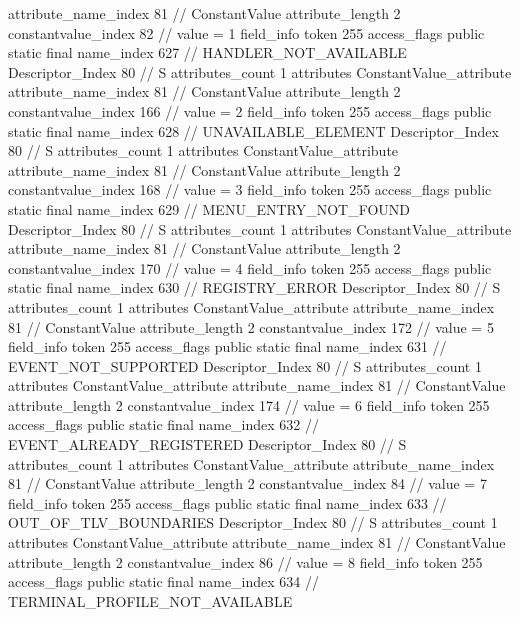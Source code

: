 {{{{{{{					attribute_name_index	81		// ConstantValue
					attribute_length	2
					constantvalue_index	82		// value = 1
				}
				}
			}
			field_info {
				token	255
				access_flags	public static final
				name_index	627		// HANDLER_NOT_AVAILABLE
				Descriptor_Index	80		// S
				attributes_count	1
				attributes {
				ConstantValue_attribute {
					attribute_name_index	81		// ConstantValue
					attribute_length	2
					constantvalue_index	166		// value = 2
				}
				}
			}
			field_info {
				token	255
				access_flags	public static final
				name_index	628		// UNAVAILABLE_ELEMENT
				Descriptor_Index	80		// S
				attributes_count	1
				attributes {
				ConstantValue_attribute {
					attribute_name_index	81		// ConstantValue
					attribute_length	2
					constantvalue_index	168		// value = 3
				}
				}
			}
			field_info {
				token	255
				access_flags	public static final
				name_index	629		// MENU_ENTRY_NOT_FOUND
				Descriptor_Index	80		// S
				attributes_count	1
				attributes {
				ConstantValue_attribute {
					attribute_name_index	81		// ConstantValue
					attribute_length	2
					constantvalue_index	170		// value = 4
				}
				}
			}
			field_info {
				token	255
				access_flags	public static final
				name_index	630		// REGISTRY_ERROR
				Descriptor_Index	80		// S
				attributes_count	1
				attributes {
				ConstantValue_attribute {
					attribute_name_index	81		// ConstantValue
					attribute_length	2
					constantvalue_index	172		// value = 5
				}
				}
			}
			field_info {
				token	255
				access_flags	public static final
				name_index	631		// EVENT_NOT_SUPPORTED
				Descriptor_Index	80		// S
				attributes_count	1
				attributes {
				ConstantValue_attribute {
					attribute_name_index	81		// ConstantValue
					attribute_length	2
					constantvalue_index	174		// value = 6
				}
				}
			}
			field_info {
				token	255
				access_flags	public static final
				name_index	632		// EVENT_ALREADY_REGISTERED
				Descriptor_Index	80		// S
				attributes_count	1
				attributes {
				ConstantValue_attribute {
					attribute_name_index	81		// ConstantValue
					attribute_length	2
					constantvalue_index	84		// value = 7
				}
				}
			}
			field_info {
				token	255
				access_flags	public static final
				name_index	633		// OUT_OF_TLV_BOUNDARIES
				Descriptor_Index	80		// S
				attributes_count	1
				attributes {
				ConstantValue_attribute {
					attribute_name_index	81		// ConstantValue
					attribute_length	2
					constantvalue_index	86		// value = 8
				}
				}
			}
			field_info {
				token	255
				access_flags	public static final
				name_index	634		// TERMINAL_PROFILE_NOT_AVAILABLE
}}}}}
